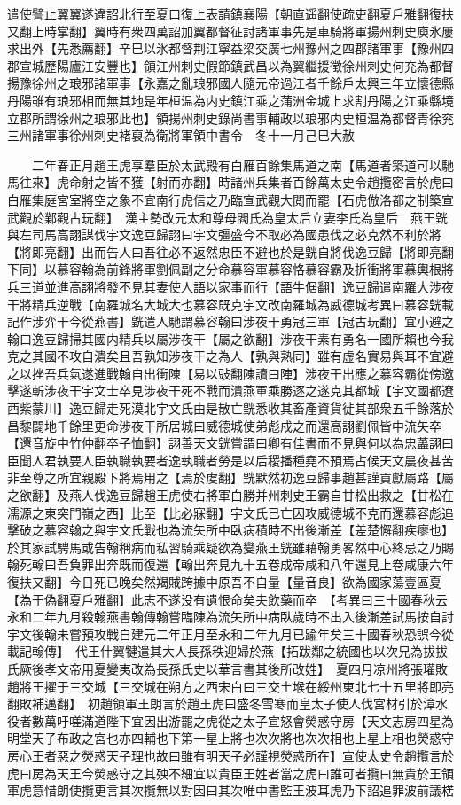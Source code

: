 遣使譬止翼翼遂違詔北行至夏口復上表請鎮襄陽【朝直遥翻使疏吏翻夏戶雅翻復扶又翻上時掌翻】翼時有衆四萬詔加翼都督征討諸軍事先是車騎將軍揚州刺史庾氷屢求出外【先悉薦翻】辛巳以氷都督荆江寧益梁交廣七州豫州之四郡諸軍事【豫州四郡宣城歷陽廬江安豐也】領江州刺史假節鎮武昌以為翼繼援徵徐州刺史何充為都督揚豫徐州之琅邪諸軍事【永嘉之亂琅邪國人隨元帝過江者千餘戶太興三年立懷德縣丹陽雖有琅邪相而無其地是年桓温為内史鎮江乘之蒲洲金城上求割丹陽之江乘縣境立郡所謂徐州之琅邪此也】領揚州刺史錄尚書事輔政以琅邪内史桓温為都督青徐兖三州諸軍事徐州刺史褚裒為衛將軍領中書令　冬十一月己巳大赦

　　二年春正月趙王虎享羣臣於太武殿有白雁百餘集馬道之南【馬道者築道可以馳馬往來】虎命射之皆不獲【射而亦翻】時諸州兵集者百餘萬太史令趙攬密言於虎曰白雁集庭宮室將空之象不宜南行虎信之乃臨宣武觀大閲而罷【石虎倣洛都之制築宣武觀於鄴觀古玩翻】　漢主勢改元太和尊母閻氏為皇太后立妻李氏為皇后　燕王皝與左司馬高詡謀伐宇文逸豆歸詡曰宇文彊盛今不取必為國患伐之必克然不利於將【將即亮翻】出而告人曰吾往必不返然忠臣不避也於是皝自將伐逸豆歸【將即亮翻下同】以慕容翰為前鋒將軍劉佩副之分命慕容軍慕容恪慕容霸及折衝將軍慕輿根將兵三道並進高詡將發不見其妻使人語以家事而行【語牛倨翻】逸豆歸遣南羅大涉夜干將精兵逆戰【南羅城名大城大也慕容既克宇文改南羅城為威德城考異曰慕容皝載記作涉弈干今從燕書】皝遣人馳謂慕容翰曰涉夜干勇冠三軍【冠古玩翻】宜小避之翰曰逸豆歸掃其國内精兵以屬涉夜干【屬之欲翻】涉夜干素有勇名一國所賴也今我克之其國不攻自潰矣且吾孰知涉夜干之為人【孰與熟同】雖有虚名實易與耳不宜避之以挫吾兵氣遂進戰翰自出衝陳【易以䜴翻陳讀曰陣】涉夜干出應之慕容霸從傍邀擊遂斬涉夜干宇文士卒見涉夜干死不戰而潰燕軍乘勝逐之遂克其都城【宇文國都遼西紫蒙川】逸豆歸走死漠北宇文氏由是散亡皝悉收其畜產資貨徙其部衆五千餘落於昌黎闢地千餘里更命涉夜干所居城曰威德城使弟彪戍之而還高詡劉佩皆中流矢卒【還音旋中竹仲翻卒子恤翻】詡善天文皝嘗謂曰卿有佳書而不見與何以為忠藎詡曰臣聞人君執要人臣執職執要者逸執職者勞是以后稷播種堯不預焉占候天文晨夜甚苦非至尊之所宜親殿下將焉用之【焉於䖍翻】皝默然初逸豆歸事趙甚謹貢獻屬路【屬之欲翻】及燕人伐逸豆歸趙王虎使右將軍白勝并州刺史王霸自甘松出救之【甘松在濡源之東突門嶺之西】比至【比必寐翻】宇文氏已亡因攻威德城不克而還慕容彪追擊破之慕容翰之與宇文氏戰也為流矢所中臥病積時不出後漸差【差楚懈翻疾瘳也】於其家試騁馬或告翰稱病而私習騎乘疑欲為變燕王皝雖藉翰勇畧然中心終忌之乃賜翰死翰曰吾負罪出奔既而復還【翰出奔見九十五卷成帝咸和八年還見上卷咸康六年復扶又翻】今日死已晚矣然羯賊跨據中原吾不自量【量音良】欲為國家蕩壹區夏【為于偽翻夏戶雅翻】此志不遂没有遺恨命矣夫飲藥而卒　【考異曰三十國春秋云永和二年九月殺翰燕書翰傳翰嘗臨陳為流矢所中病臥歲時不出入後漸差試馬按自討宇文後翰未嘗預攻戰自建元二年正月至永和二年九月已踰年矣三十國春秋恐誤今從載記翰傳】　代王什翼犍遣其大人長孫秩迎婦於燕【拓跋鄰之統國也以次兄為拔拔氏厥後孝文帝用夏變夷改為長孫氏史以華言書其後所改姓】　夏四月凉州將張瓘敗趙將王擢于三交城【三交城在朔方之西宋白曰三交土堠在綏州東北七十五里將即亮翻敗補邁翻】　初趙領軍王朗言於趙王虎曰盛冬雪寒而皇太子使人伐宮材引於漳水役者數萬吁嗟滿道陛下宜因出游罷之虎從之太子宣怒會熒惑守房【天文志房四星為明堂天子布政之宮也亦四輔也下第一星上將也次次將也次次相也上星上相也熒惑守房心王者惡之熒惑天子理也故曰雖有明天子必謹視熒惑所在】宣使太史令趙攬言於虎曰房為天王今熒惑守之其殃不細宜以貴臣王姓者當之虎曰誰可者攬曰無貴於王領軍虎意惜朗使攬更言其次攬無以對因曰其次唯中書監王波耳虎乃下詔追罪波前議楛